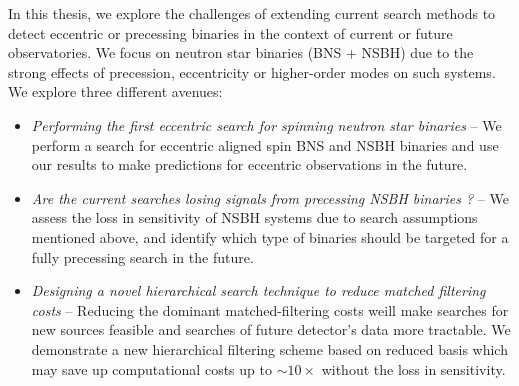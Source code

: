 In this thesis, we explore the challenges of extending current search methods to detect eccentric or precessing binaries in the context of current or future observatories. We focus on neutron star binaries (BNS + NSBH) due to the strong effects of precession, eccentricity or higher-order modes on such systems.  We explore three different avenues:
\begin{itemize}
    \item \textit{Performing the first eccentric search for spinning neutron star binaries} --  We perform a search for eccentric aligned spin BNS and NSBH binaries and use our results to make predictions for eccentric observations in the future.
    \item \textit{Are the current searches losing signals from precessing NSBH binaries ?} -- We assess the loss in sensitivity of NSBH systems due to search assumptions mentioned above, and identify which type of binaries should be targeted for a fully precessing search in the future.
    \item \textit{Designing a novel hierarchical search technique to reduce matched filtering costs} --  Reducing the dominant matched-filtering costs weill make searches for new sources feasible and searches of future detector’s data more tractable. We demonstrate a new hierarchical filtering scheme based on reduced basis which may save up computational costs up to $\sim 10\times$ without the loss in sensitivity.
\end{itemize}












